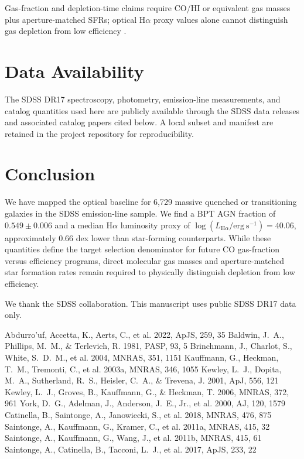 \documentclass[twocolumn]{aastex631}
\begin{document}
Gas-fraction and depletion-time claims require CO/HI or equivalent gas masses plus aperture-matched SFRs; optical H$\alpha$ proxy values alone cannot distinguish gas depletion from low efficiency \citep{coldgass1,coldgass2,xcoldgass2017,xgass2018}.


\section{Data Availability}\label{sec:data-avail}
The SDSS DR17 spectroscopy, photometry, emission-line measurements, and catalog quantities used here are publicly available through the SDSS data releases and associated catalog papers cited below. A local subset and manifest are retained in the project repository for reproducibility.

\section{Conclusion}\label{sec:conclusion}
We have mapped the optical baseline for 6,729 massive quenched or transitioning galaxies in the SDSS emission-line sample. We find a BPT AGN fraction of $0.549 \pm 0.006$ and a median H$\alpha$ luminosity proxy of $\log(L_{\mathrm{H}\alpha} / \mathrm{erg~s}^{-1}) = 40.06$, approximately 0.66 dex lower than star-forming counterparts. While these quantities define the target selection denominator for future CO gas-fraction versus efficiency programs, direct molecular gas masses and aperture-matched star formation rates remain required to physically distinguish depletion from low efficiency.

\acknowledgments
We thank the SDSS collaboration. This manuscript uses public SDSS DR17 data only.


\begin{thebibliography}{}
 Abdurro'uf, Accetta, K., Aerts, C., et al. 2022, ApJS, 259, 35
 Baldwin, J.~A., Phillips, M.~M., \& Terlevich, R. 1981, PASP, 93, 5
 Brinchmann, J., Charlot, S., White, S.~D.~M., et al. 2004, MNRAS, 351, 1151
 Kauffmann, G., Heckman, T.~M., Tremonti, C., et al. 2003a, MNRAS, 346, 1055
 Kewley, L.~J., Dopita, M.~A., Sutherland, R.~S., Heisler, C.~A., \& Trevena, J. 2001, ApJ, 556, 121
 Kewley, L.~J., Groves, B., Kauffmann, G., \& Heckman, T. 2006, MNRAS, 372, 961
 York, D.~G., Adelman, J., Anderson, J.~E., Jr., et al. 2000, AJ, 120, 1579
 Catinella, B., Saintonge, A., Janowiecki, S., et al. 2018, MNRAS, 476, 875
 Saintonge, A., Kauffmann, G., Kramer, C., et al. 2011a, MNRAS, 415, 32
 Saintonge, A., Kauffmann, G., Wang, J., et al. 2011b, MNRAS, 415, 61
 Saintonge, A., Catinella, B., Tacconi, L.~J., et al. 2017, ApJS, 233, 22
\end{thebibliography}
\end{document}

